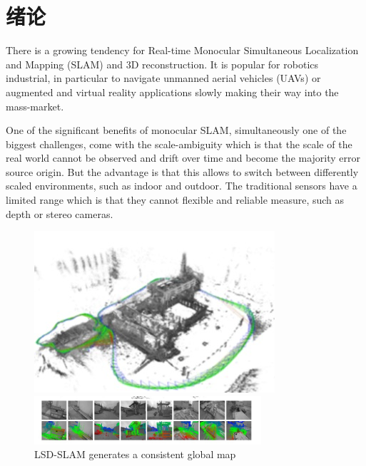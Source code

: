 
\chapter{绪论}
\label{chap:intro}


There is a growing tendency for Real-time Monocular Simultaneous Localization and Mapping (SLAM) and 3D reconstruction. It is popular for robotics industrial, in particular to navigate unmanned aerial vehicles (UAVs) or augmented and virtual reality applications slowly making their way into the mass-market.

One of the significant benefits of monocular SLAM, simultaneously one of the biggest challenges, come with the scale-ambiguity which is that the scale of the real world cannot be observed and drift over time and become the majority error source origin. But the advantage is that this allows to switch between differently scaled environments, such as indoor and outdoor. The traditional sensors have a limited range which is that they cannot flexible and reliable measure, such as depth or stereo cameras.

\begin{figure}
  \centering
  \includegraphics[height=0.5\textwidth]{figures/Fig1(1)}
  
  \centering
  \includegraphics[width=0.75\textwidth]{figures/Fig1(2)}
  \caption{LSD-SLAM generates a consistent global map}
\end{figure}

